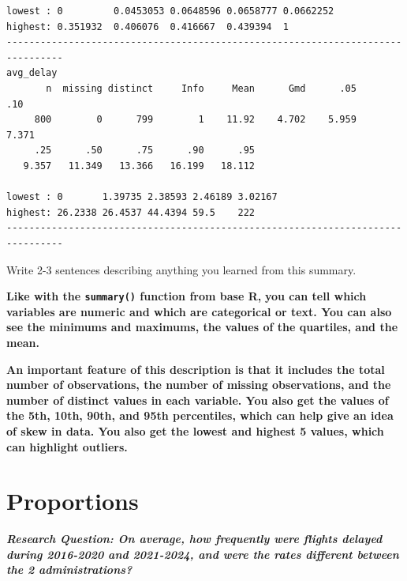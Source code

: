 \documentclass[
  letterpaper,
  DIV=11,
  numbers=noendperiod]{scrartcl}
\begin{document}
\begin{verbatim}
lowest : 0         0.0453053 0.0648596 0.0658777 0.0662252
highest: 0.351932  0.406076  0.416667  0.439394  1        
--------------------------------------------------------------------------------
avg_delay 
       n  missing distinct     Info     Mean      Gmd      .05      .10 
     800        0      799        1    11.92    4.702    5.959    7.371 
     .25      .50      .75      .90      .95 
   9.357   11.349   13.366   16.199   18.112 

lowest : 0       1.39735 2.38593 2.46189 3.02167
highest: 26.2338 26.4537 44.4394 59.5    222    
--------------------------------------------------------------------------------
\end{verbatim}

Write 2-3 sentences describing anything you learned from this summary.

\begin{tcolorbox}[enhanced jigsaw, toprule=.15mm, breakable, leftrule=.75mm, bottomrule=.15mm, rightrule=.15mm, colback=white, opacityback=0, colframe=quarto-callout-warning-color-frame, left=2mm, arc=.35mm]

\textbf{Like with the \texttt{summary()} function from base R,}
\textbf{you can tell which variables are numeric and which are
categorical or text. You can also see the minimums and maximums, the
values of the quartiles, and the mean.}

\textbf{An important feature of this description is that it includes the
total number of observations, the number of missing observations, and
the number of distinct values in each variable. You also get the values
of the 5th, 10th, 90th, and 95th percentiles, which can help give an
idea of skew in data. You also get the lowest and highest 5 values,
which can highlight outliers.}

\end{tcolorbox}

\section{Proportions}\label{proportions}

\textbf{\emph{Research Question: On average, how frequently were flights
delayed during 2016-2020 and 2021-2024, and were the rates different
between the 2 administrations?}}
\end{document}
